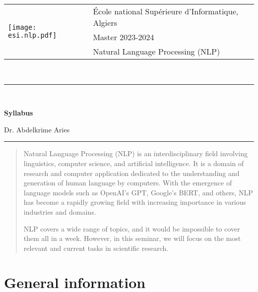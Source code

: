 \documentclass[11pt, a4paper]{article}
\begin{document}
\pagestyle{fancy}

\noindent
\begin{tabular}{ll}
\multirow{3}{*}{\texttt{[image: esi.nlp.pdf]}} & \'Ecole national Supérieure d'Informatique, Algiers\\
& Master 2023-2024\\
& Natural Language Processing (NLP)
\end{tabular}\\[.25cm]
\noindent\rule{\textwidth}{1pt}\\[-0.25cm]
\begin{center}
{\LARGE \textbf{Syllabus}}
\begin{flushright}
	Dr. Abdelkrime Aries
\end{flushright}
\end{center}\vspace*{-0.25cm}
\noindent\rule{\textwidth}{1pt}

\begin{abstract}
	Natural Language Processing (NLP) is an interdisciplinary field involving linguistics, computer science, and artificial intelligence. 
	It is a domain of research and computer application dedicated to the understanding and generation of human language by computers. 
	With the emergence of language models such as OpenAI's GPT, Google's BERT, and others, NLP has become a rapidly growing field with increasing importance in various industries and domains.
	
	NLP covers a wide range of topics, and it would be impossible to cover them all in a week. 
	However, in this seminar, we will focus on the most relevant and current tasks in scientific research.
\end{abstract}

\section{General information}
\end{document}
